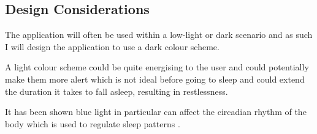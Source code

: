\subsection{Design Considerations}\label{design-considerations}

The application will often be used within a low-light or dark scenario
and as such I will design the application to use a dark colour scheme.

A light colour scheme could be quite energising to the user and could
potentially make them more alert which is not ideal before going to
sleep and could extend the duration it takes to fall asleep, resulting
in restlessness.

It has been shown blue light in particular can affect the circadian
rhythm of the body which is used to regulate sleep patterns
\cite{oh2015analysis}.
